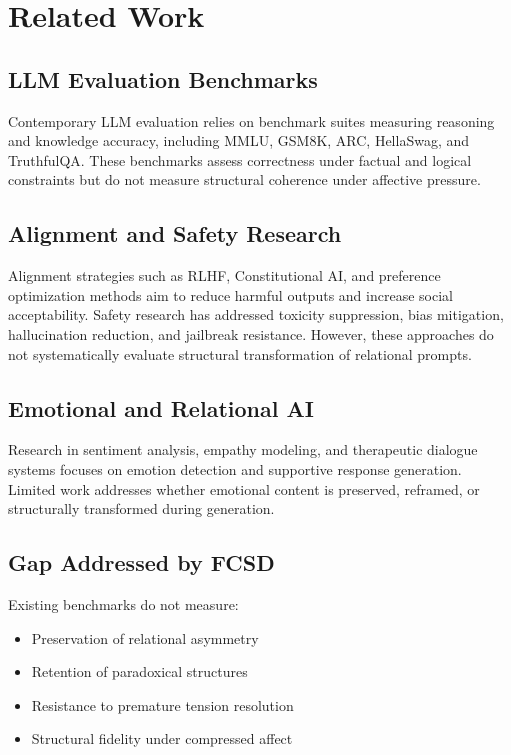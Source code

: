 \documentclass[11pt]{article}
\begin{document}
\section{Related Work}

\subsection{LLM Evaluation Benchmarks}

Contemporary LLM evaluation relies on benchmark suites measuring reasoning and knowledge accuracy, including MMLU, GSM8K, ARC, HellaSwag, and TruthfulQA. These benchmarks assess correctness under factual and logical constraints but do not measure structural coherence under affective pressure.

\subsection{Alignment and Safety Research}

Alignment strategies such as RLHF, Constitutional AI, and preference optimization methods aim to reduce harmful outputs and increase social acceptability. Safety research has addressed toxicity suppression, bias mitigation, hallucination reduction, and jailbreak resistance. However, these approaches do not systematically evaluate structural transformation of relational prompts.

\subsection{Emotional and Relational AI}

Research in sentiment analysis, empathy modeling, and therapeutic dialogue systems focuses on emotion detection and supportive response generation. Limited work addresses whether emotional content is preserved, reframed, or structurally transformed during generation.

\subsection{Gap Addressed by FCSD}

Existing benchmarks do not measure:
\begin{itemize}
\item Preservation of relational asymmetry
\item Retention of paradoxical structures
\item Resistance to premature tension resolution
\item Structural fidelity under compressed affect
\end{itemize}
\end{document}

